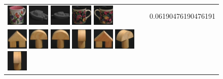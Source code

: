 {\begin{figure}[p]
\begin{tabular}{m{11cm} | m{3cm} |}
\includegraphics[width=1cm]{coil/beeld-9.eps}
\includegraphics[width=1cm]{coil/beeld-25.eps}
\includegraphics[width=1cm]{coil/beeld-24.eps}
\includegraphics[width=1cm]{coil/beeld-60.eps}
\includegraphics[width=1cm]{coil/beeld-61.eps}
& {\scriptsize 0.06190476190476191}
\\
\includegraphics[width=1cm]{coil/beeld-42.eps}
\includegraphics[width=1cm]{coil/beeld-0.eps}
\includegraphics[width=1cm]{coil/beeld-1.eps}
\includegraphics[width=1cm]{coil/beeld-5.eps}
\includegraphics[width=1cm]{coil/beeld-43.eps}
\includegraphics[width=1cm]{coil/beeld-3.eps}
\includegraphics[width=1cm]{coil/beeld-2.eps}

\end{tabular}
\end{figure}}
